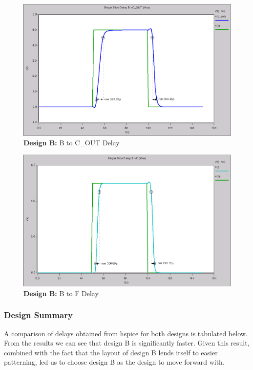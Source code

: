 \documentclass{article}
\begin{document}
\begin{figure}[H]
    \centering
    \includegraphics[width=\linewidth]{../part_3/max/max_single_slice_b_to_cout.png}
    \caption{\textbf{Design B:} B to C\_OUT Delay}
\end{figure}

\begin{figure}[H]
    \centering
    \includegraphics[width=\linewidth]{../part_3/max/max_single_slice_b_to_f.png}
    \caption{\textbf{Design B:} B to F Delay}
\end{figure}

\vspace{0.5in}
\subsubsection*{Design Summary}

A comparison of delays obtained from hspice for both designs is tabulated
below. From the results we can see that design B is significantly faster. Given
this result, combined with the fact that the layout of design B lends itself to
easier patterning, led us to choose design B as the design to move forward with.
\end{document}
